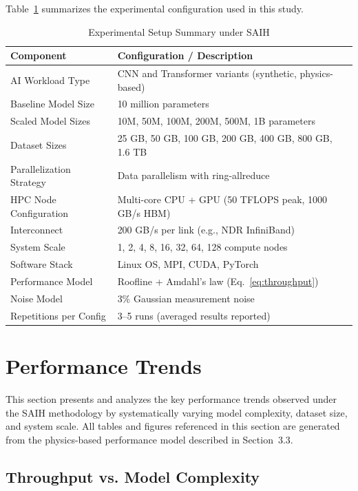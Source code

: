 \documentclass{llncs}
\begin{document}
Table~\ref{tab:setup} summarizes the experimental configuration used in this study.

\begin{table}[h]
\centering
\caption{Experimental Setup Summary under SAIH}
\label{tab:setup}
\begin{tabular*}{\columnwidth}{@{\extracolsep{\fill}} ll @{}}
\toprule
\textbf{Component} & \textbf{Configuration / Description} \\
\midrule
AI Workload Type & CNN and Transformer variants (synthetic, physics-based) \\
Baseline Model Size & 10 million parameters \\
Scaled Model Sizes & 10M, 50M, 100M, 200M, 500M, 1B parameters \\
Dataset Sizes & 25 GB, 50 GB, 100 GB, 200 GB, 400 GB, 800 GB, 1.6 TB \\
Parallelization Strategy & Data parallelism with ring-allreduce \\
HPC Node Configuration & Multi-core CPU + GPU (50 TFLOPS peak, 1000 GB/s HBM) \\
Interconnect & 200 GB/s per link (e.g., NDR InfiniBand) \\
System Scale & 1, 2, 4, 8, 16, 32, 64, 128 compute nodes \\
Software Stack & Linux OS, MPI, CUDA, PyTorch \\
Performance Model & Roofline + Amdahl's law (Eq.~\ref{eq:throughput}) \\
Noise Model & 3\% Gaussian measurement noise \\
Repetitions per Config & 3--5 runs (averaged results reported) \\
\bottomrule
\end{tabular*}
\end{table}

\section{Performance Trends}

This section presents and analyzes the key performance trends observed under the SAIH methodology by systematically varying model complexity, dataset size, and system scale. All tables and figures referenced in this section are generated from the physics-based performance model described in Section~3.3.

\subsection{Throughput vs. Model Complexity}
\end{document}
